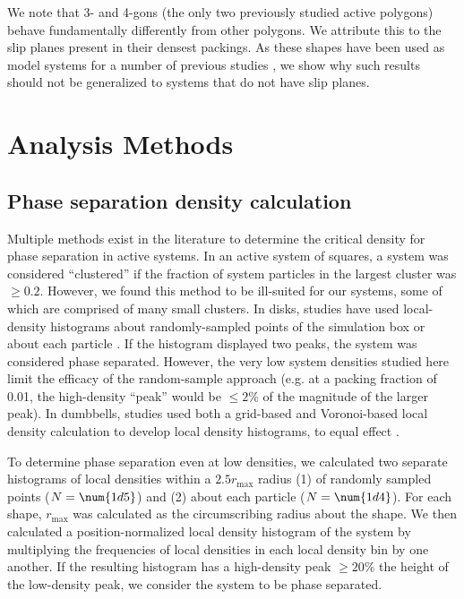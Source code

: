 We note that 3- and 4-gons (the only two previously studied active polygons) behave fundamentally differently from other polygons.
We attribute this to the slip planes present in their densest packings.
As these shapes have been used as model systems for a number of previous studies \cite{Wensink_2014_PRE,Ilse_2016_JChemPhys,Prymidis_2016_SoftMatter}, we show why such results should not be generalized to systems that do not have slip planes.



\section{Analysis Methods}
\label{sec:methods}

\subsection{Phase separation density calculation}
\label{sec:critical-density}

Multiple methods exist in the literature to determine the critical density for phase separation in active systems.
In an active system of squares\cite{Prymidis_2016_SoftMatter}, a system was considered ``clustered'' if the fraction of system particles in the largest cluster was ${\geq}0.2$.
However, we found this method to be ill-suited for our systems, some of which are comprised of many small clusters.
In disks, studies have used local-density histograms about randomly-sampled points of the simulation box \cite{Bruss_2018_PRE} or about each particle \cite{Redner_2013_PRL}.
If the histogram displayed two peaks, the system was considered phase separated.
However, the very low system densities studied here limit the efficacy of the random-sample approach (e.g. at a packing fraction of 0.01, the high-density ``peak'' would be ${\leq}2\%$ of the magnitude of the larger peak).
In dumbbells, studies used both a grid-based and Voronoi-based local density calculation to develop local density histograms, to equal effect \cite{Petrelli_2018_EPJ}.

To determine phase separation even at low densities, we calculated two separate histograms of local densities within a $2.5r_\text{max}$ radius (1) of randomly sampled points ($N=\num{1d5}$) and (2) about each particle ($N=\num{1d4}$).
For each shape, $r_\text{max}$ was calculated as the circumscribing radius about the shape.
We then calculated a position-normalized local density histogram of the system by multiplying the frequencies of local densities in each local density bin by one another.
If the resulting histogram has a high-density peak ${\geq}20\%$ the height of the low-density peak, we consider the system to be phase separated.

